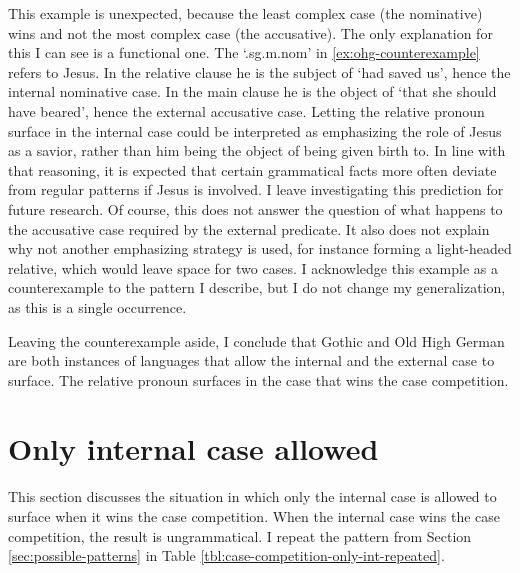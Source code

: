 This example is unexpected, because the least complex case (the nominative) wins and not the most complex case (the accusative).
The only explanation for this I can see is a functional one. The  `.\ac{sg}.\ac{m}.\ac{nom}' in \ref{ex:ohg-counterexample} refers to Jesus. In the relative clause he is the subject of  `had saved us', hence the internal nominative case. In the main clause he is the object of  `that she should have beared', hence the external accusative case.
Letting the relative pronoun surface in the internal case could be interpreted as emphasizing the role of Jesus as a savior, rather than him being the object of being given birth to. In line with that reasoning, it is expected that certain grammatical facts more often deviate from regular patterns if Jesus is involved. I leave investigating this prediction for future research.
Of course, this does not answer the question of what happens to the accusative case required by the external predicate. It also does not explain why not another emphasizing strategy is used, for instance forming a light-headed relative, which would leave space for two cases.
I acknowledge this example as a counterexample to the pattern I describe, but I do not change my generalization, as this is a single occurrence.

Leaving the counterexample aside, I conclude that Gothic and Old High German are both instances of languages that allow the internal and the external case to surface. The relative pronoun surfaces in the case that wins the case competition.


\section{Only internal case allowed}\label{sec:pattern-ii}


This section discusses the situation in which only the internal case is allowed to surface when it wins the case competition. When the internal case wins the case competition, the result is ungrammatical. I repeat the pattern from Section \ref{sec:possible-patterns} in Table \ref{tbl:case-competition-only-int-repeated}.

